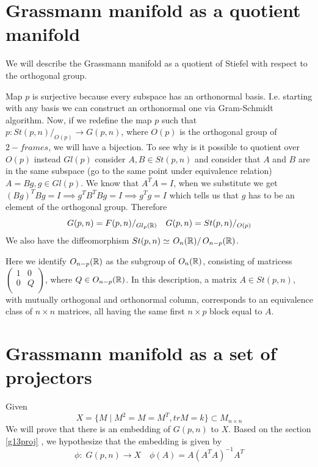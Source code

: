 \documentclass[11pt,a4paper]{report}
\begin{document}
\section{Grassmann manifold as a quotient manifold } \label{grassquot}
We will describe the Grassmann manifold as a quotient of Stiefel with respect to the orthogonal group.
\begin{center}
\end{center}
Map $p$ is surjective because every subspace has an orthonormal basis.
I.e. starting with any basis we can construct an orthonormal one via Gram-Schmidt algorithm.
Now, if we redefine the map $p$ such that $p: { St(p,n) / _{O(p)}} \to G(p,n)$, where $O(p)$
is the orthogonal group of $2-frames$, we will have a bijection. 
To see why is it possible to quotient over $O(p)$ instead $Gl(p)$ consider $A,B \in St(p,n)$ and consider that $A$ and $B$ are in the same subspace (go to the same point under equivalence relation) $A = B g, g \in Gl(p)$.
We know that $ A^T A = I $, when we substitute we get $ (Bg)^T Bg = I \implies g^T B^T B g = I \implies g^T g = I$ which tells us that $g$ has to be an element of the orthogonal group.
Therefore 
$$ G(p,n) = F(p,n) / _{Gl_p(\mathbb{R})} \quad G(p,n) = St(p,n) / _{O(p) }$$
%
%
    We also have the diffeomorphism $St(p,n)\simeq\left. O_n(\mathbb{R})\right/O_{n-p}(\mathbb{R})$.
    
     Here
	we identify $O_{n-p}(\mathbb{R})$ as the subgroup of $O_n(\mathbb{R})$, consisting of matricess $\begin{pmatrix}
	                                                                               	1&0\\
	                                                                               	0&Q\\
	                                                                               \end{pmatrix}$,
	where $Q\in O_{n-p}(\mathbb{R})$. In this description, a matrix $A\in St(p,n)$, with mutually orthogonal and orthonormal
	column, 
	corresponds to an equivalence class of $n\times n$ matrices, all having the same first $n\times p$ block  equal to $A$.

\section{Grassmann manifold as a set of projectors }
Given
$$ X = \{ M \; | \; M^2 = M = M^T, trM=k \} \subset M_{n \times n} $$
We will prove that there is an embedding of $G(p,n)$ to $X$.
Based on the section \ref{g13proj} , we hypothesize that the embedding is given by
$$ \phi: \; G(p,n) \to X \quad \phi(A) = A(A^T A)^{-1} A^T  $$
\end{document}
